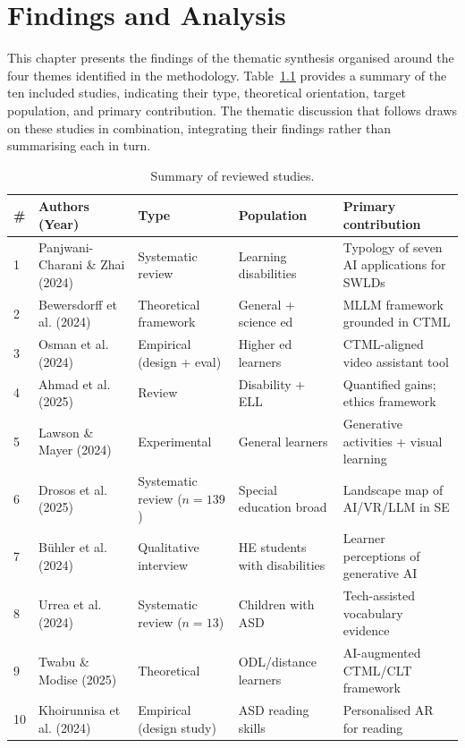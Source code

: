 %
%
\chapter{Findings and Analysis}
\label{chap:findings}
\setlength{\parskip}{1em}
%
This chapter presents the findings of the thematic synthesis organised around the four themes identified in the methodology. Table~\ref{tab:studies} provides a summary of the ten included studies, indicating their type, theoretical orientation, target population, and primary contribution. The thematic discussion that follows draws on these studies in combination, integrating their findings rather than summarising each in turn.

\begin{table}[H]
\centering
\caption{Summary of reviewed studies.}
\label{tab:studies}
\small
\begin{tabular}{p{0.4cm}p{3.2cm}p{2.6cm}p{2.6cm}p{4.2cm}}
\hline
\# & Authors (Year) & Type & Population & Primary contribution \\
\hline
1 & Panjwani-Charani \& Zhai (2024) & Systematic review & Learning disabilities & Typology of seven AI applications for SWLDs \\
2 & Bewersdorff et al. (2024) & Theoretical framework & General + science ed & MLLM framework grounded in CTML \\
3 & Osman et al. (2024) & Empirical (design + eval) & Higher ed learners & CTML-aligned video assistant tool \\
4 & Ahmad et al. (2025) & Review & Disability + ELL & Quantified gains; ethics framework \\
5 & Lawson \& Mayer (2024) & Experimental & General learners & Generative activities + visual learning \\
6 & Drosos et al. (2025) & Systematic review ($n=139$) & Special education broad & Landscape map of AI/VR/LLM in SE \\
7 & B\"uhler et al. (2024) & Qualitative interview & HE students with disabilities & Learner perceptions of generative AI \\
8 & Urrea et al. (2024) & Systematic review ($n=13$) & Children with ASD & Tech-assisted vocabulary evidence \\
9 & Twabu \& Modise (2025) & Theoretical & ODL/distance learners & AI-augmented CTML/CLT framework \\
10 & Khoirunnisa et al. (2024) & Empirical (design study) & ASD reading skills & Personalised AR for reading \\
\hline
\end{tabular}
\end{table}

